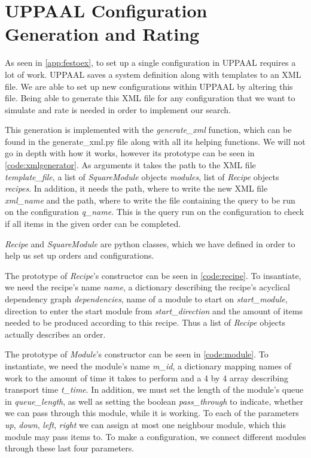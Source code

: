 \section{UPPAAL Configuration Generation and Rating}\label{sec:uppaalpython}
As seen in \cref{app:festoex}, to set up a single configuration in UPPAAL requires a lot of work. UPPAAL saves a system definition along with templates to an XML file. We are able to set up new configurations within UPPAAL by altering this file. Being able to generate this XML file for any configuration that we want to simulate and rate is needed in order to implement our search.

This generation is implemented with the \textit{generate\_xml} function, which can be found in the generate\_xml.py file along with all its helping functions. We will not go in depth with how it works, however its prototype can be seen in \cref{code:xmlgenerator}. As arguments it takes the path to the XML file \textit{template\_file}, a list of \textit{SquareModule} objects \textit{modules}, list of \textit{Recipe} objects \textit{recipes}. In addition, it needs the path, where to write the new XML file \textit{xml\_name} and the path, where to write the file containing the query to be run on the configuration \textit{q\_name}. This is the query run on the configuration to check if all items in the given order can be completed. 



\textit{Recipe} and \textit{SquareModule} are python classes, which we have defined in order to help us set up orders and configurations. 

The prototype of \textit{Recipe}'s constructor can be seen in \cref{code:recipe}. To insantiate, we need the recipe's name \textit{name}, a dictionary describing the recipe's acyclical dependency graph \textit{dependencies}, name of a module to start on \textit{start\_module}, direction to enter the start module from \textit{start\_direction} and the amount of items needed to be produced according to this recipe. Thus a list of \textit{Recipe} objects actually describes an order.



The prototype of \textit{Module}'s constructor can be seen in \cref{code:module}. To instantiate, we need the module's name \textit{m\_id}, a dictionary mapping names of work to the amount of time it takes to perform and a 4 by 4 array describing transport time \textit{t\_time}. In addition, we must set the length of the module's queue in \textit{queue\_length}, as well as setting the boolean \textit{pass\_through} to indicate, whether we can pass through this module, while it is working. To each of the parameters \textit{up}, \textit{down}, \textit{left}, \textit{right} we can assign at most one neighbour module, which this module may pass items to. To make a configuration, we connect different modules through these last four parameters.

